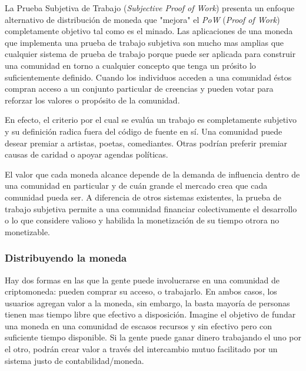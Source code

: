 \documentclass[a4paper,titlepage,final]{article}
\begin{document}
La Prueba Subjetiva de Trabajo (\textit{Subjective Proof of Work}) presenta un enfoque alternativo de distribución de moneda que "mejora" el \textit{PoW }(\textit{Proof of Work}) completamente objetivo tal como es el minado. Las aplicaciones de una moneda que implementa una prueba de trabajo subjetiva son mucho mas amplias que cualquier sistema de prueba de trabajo porque puede ser aplicada para construir una comunidad en torno a cualquier concepto que tenga un prósito lo suficientemente definido. Cuando los individuos acceden a una comunidad éstos compran acceso a un conjunto particular de creencias y pueden votar para reforzar los valores o propósito de la comunidad.

En efecto, el criterio por el cual se evalúa un trabajo es completamente subjetivo y su definición radica fuera del código de fuente en sí. Una comunidad puede desear premiar a artistas, poetas, comediantes. Otras podrían preferir premiar causas de caridad o apoyar agendas políticas.

El valor que cada moneda alcance depende de la demanda de influencia dentro de una comunidad en particular y de cuán grande el mercado crea que cada comunidad pueda ser. A diferencia de otros sistemas existentes, la prueba de trabajo subjetiva permite a una comunidad financiar colectivamente el desarrollo o lo que considere valioso y habilida la monetización de su tiempo otrora no monetizable.

\subsubsection{Distribuyendo la moneda}

Hay dos formas en las que la gente puede involucrarse en una comunidad de criptomoneda: pueden comprar su acceso, o trabajarlo. En ambos casos, los usuarios agregan valor a la moneda, sin embargo, la basta mayoría de personas tienen mas tiempo libre que efectivo a disposición. Imagine el objetivo de fundar una moneda en una comunidad de escasos recursos y sin efectivo pero con suficiente tiempo disponible. Si la gente puede ganar dinero trabajando el uno por el otro, podrán crear valor a través del intercambio mutuo facilitado por un sistema justo de contabilidad/moneda.
\end{document}
